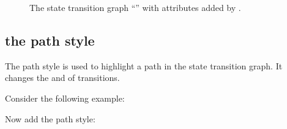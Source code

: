 \documentclass[letterpaper,10pt,english]{sphinxmanual}
\begin{document}
\begin{figure}[htbp]
\centering
\capstart

\noindent{}
\caption{The state transition graph “” with attributes added by {\hyperref[\detokenize{StateTransitionGraphs:add-style-tendencies}]{}}.}\label{\detokenize{Manual:figure11}}\label{\detokenize{Manual:id15}}\end{figure}


\subsection{the path style}
\label{\detokenize{Manual:the-path-style}}
The path style is used to highlight a path in the state transition graph.
It changes the  and  of transitions.

Consider the following example:

\begin{sphinxVerbatim}[commandchars=\\\{\}]
  \PYG{p}{[}  \PYG{p}{]}
  
   
\PYG{p}{[}\PYG{p}{]}  
\end{sphinxVerbatim}

Now add the path style:
\end{document}
